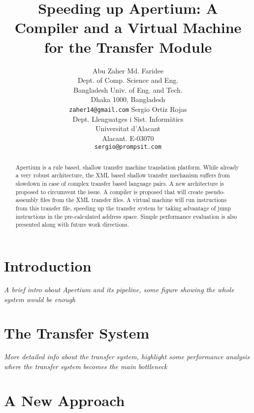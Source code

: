 \documentclass[11pt]{article}
\title{Speeding up Apertium: A Compiler and a Virtual Machine for the
  Transfer Module}
\author{Abu Zaher Md. Faridee\\
  Dept. of Comp. Science and Eng. \\
  Bangladesh Univ. of Eng. and Tech. \\
  Dhaka 1000, Bangladesh \\
  {\tt zaher14@gmail.com} \And
  Sergio Ortiz Rojas \\
  Dept. Llenguatges i Sist. Informàtics \\
  Universitat d'Alacant \\
  Alacant. E-03070 \\  
  {\tt sergio@prompsit.com}}
\date{}
\begin{document}
\maketitle

\begin{abstract}
  Apertium is a rule based, shallow transfer machine translation
  platform. While already a very robust architecture,  the XML based
  shallow transfer mechanism suffers from slowdown in case of complex
  transfer based language pairs. A new architecture is proposed to
  circumvent the issue. A compiler is proposed that will create
  pseudo-assembly files from the XML transfer files. A virtual machine
  will run instructions from this transfer file, speeding up the
  transfer system by taking advantage of jump instructions in the
  pre-calculated address space. Simple performance evaluation is also
  presented  along with future work directions.
\end{abstract}


\section{Introduction}
\label{sec:introduction}



{\itshape{A brief intro about Apertium and its pipeline, some figure
    showing the whole system would be enough}}

\section{The Transfer System}
\label{sec:transfer-system}

{\itshape{More detailed info about the transfer system, highlight some
    performance analysis where the transfer system becomes the main
    bottleneck}}

\section{A New Approach}
\label{sec:new-approach}
\end{document}
